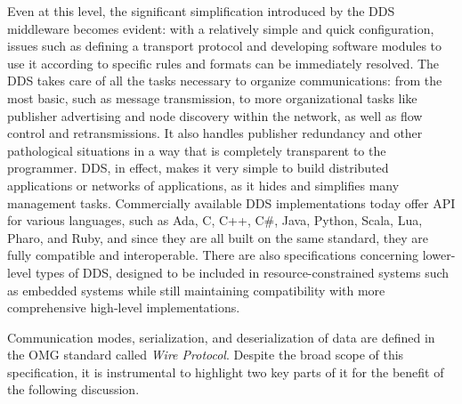 Even at this level, the significant simplification introduced by the DDS middleware becomes evident: with a relatively simple and quick configuration, issues such as defining a transport protocol and developing software modules to use it according to specific rules and formats can be immediately resolved. The DDS takes care of all the tasks necessary to organize communications: from the most basic, such as message transmission, to more organizational tasks like publisher advertising and node discovery within the network, as well as flow control and retransmissions. It also handles publisher redundancy and other pathological situations in a way that is completely transparent to the programmer. DDS, in effect, makes it very simple to build distributed applications or networks of applications, as it hides and simplifies many management tasks. Commercially available DDS implementations today offer API for various languages, such as Ada, C, C++, C\#, Java, Python, Scala, Lua, Pharo, and Ruby, and since they are all built on the same standard, they are fully compatible and interoperable. There are also specifications concerning lower-level types of DDS, designed to be included in resource-constrained systems such as embedded systems while still maintaining compatibility with more comprehensive high-level implementations.

Communication modes, serialization, and deserialization of data are defined in the OMG standard called \emph{Wire Protocol}. Despite the broad scope of this specification, it is instrumental to highlight two key parts of it for the benefit of the following discussion.

